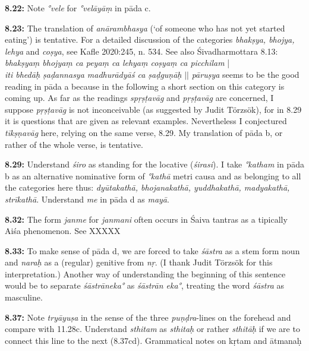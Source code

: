 \documentclass{article}
\newcommand{\vsnum}[1]{\textbf{#1}}
\newcommand{\skt}[1]{\textit{#1}}
\begin{document}
\vsnum{8.22: }Note \skt{°vele} for \skt{°velāyāṃ} in pāda c.

\vsnum{8.23: }The translation of \skt{anārambhasya} (`of someone who has not yet started eating') is tentative. For a detailed discussion of the categories \skt{bhakṣya, bhojya, lehya} and \skt{coṣya}, see Kafle 2020:245, n. 534. See also Śivadharmottara 8.13:\\ \skt{bhakṣyaṃ bhojyaṃ ca peyaṃ ca lehyaṃ coṣyaṃ ca picchilam} |\\ \skt{iti bhedāḥ ṣaḍannasya madhurādyāś ca ṣaḍguṇāḥ} $||$ \skt{pāruṣya} seems to be the good reading in pāda a because in the following a short section on this category is coming up. As far as the readings \skt{spṛṣṭavāg} and \skt{pṛṣṭavāg} are concerned, I suppose \skt{pṛṣṭavāg} is not inconceivable (as suggested by Judit Törzsök), for in 8.29 it is questions that are given as relevant examples. Nevertheless I conjectured \skt{tīkṣṇavāg} here, relying on the same verse, 8.29. My translation of pāda b, or rather of the whole verse, is tentative.

\vsnum{8.29: }Understand \skt{śiro} as standing for the locative (\skt{śirasi}). I take \skt{°katham} in pāda b as an alternative nominative form of \skt{°kathā} metri causa and as belonging to all the categories here thus: \skt{dyūtakathā, bhojanakathā, yuddhakathā, madyakathā, strīkathā}. Understand \skt{me} in pāda d as \skt{mayā}.

\vsnum{8.32: }The form \skt{janme} for \skt{janmani} often occurs in Śaiva tantras as a tipically Aiśa phenomenon. See XXXXX 

\vsnum{8.33: }To make sense of pāda d, we are forced to take \skt{śāstra} as a stem form noun and \skt{naraḥ} as a (regular) genitive from \skt{nṛ}. (I thank Judit Törzsök for this interpretation.) Another way of understanding the beginning of this sentence would be to separate \skt{śāstrāneka°} as \skt{śāstrān eka°}, treating the word \skt{śāstra} as masculine.

\vsnum{8.37: }Note \skt{tryāyuṣa} in the sense of the three \skt{puṇḍra}-lines on the forehead and compare with 11.28c. Understand \skt{sthitam} as \skt{sthitaḥ} or rather \skt{sthitāḥ} if we are to connect this line to the next (8.37cd). Grammatical notes on kṛtam and ātmanaḥ
\end{document}
